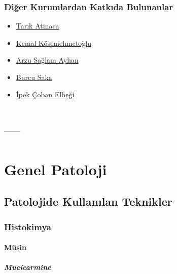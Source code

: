 \documentclass[
  letterpaper,
  DIV=11,
  numbers=noendperiod]{scrreprt}
\begin{document}
\hypertarget{sec-diger-kurumlardan-katkida-bulunanlar}{%
\section*{Diğer Kurumlardan Katkıda
Bulunanlar}\label{sec-diger-kurumlardan-katkida-bulunanlar}}


\begin{itemize}
\item
  \href{https://github.com/veterinarypathology3d}{Tarık Atmaca}
\item
  \href{https://hacettepepathology.com/}{Kemal Kösemehmetoğlu}
\item
  \href{https://www.hastane.hacettepe.edu.tr/115.html?drid=479}{Arzu
  Sağlam Ayhan}
\item
  \href{https://scholar.google.com.tr/citations?user=9e7r9yQAAAAJ}{Burcu
  Saka}
\item
  \href{https://www.florence.com.tr/prof-dr-ipek-coban-elbegi}{İpek
  Çoban Elbeği}
\end{itemize}

\part{---}

\part{Genel Patoloji}

\hypertarget{sec-patolojide-kullanilan-teknikler}{%
\chapter{Patolojide Kullanılan
Teknikler}\label{sec-patolojide-kullanilan-teknikler}}

\hypertarget{sec-histokimya}{%
\section{Histokimya}\label{sec-histokimya}}

\hypertarget{sec-musin}{%
\subsection{Müsin}\label{sec-musin}}

\hypertarget{sec-mucicarmine}{%
\subsubsection{Mucicarmine}\label{sec-mucicarmine}}
\end{document}

